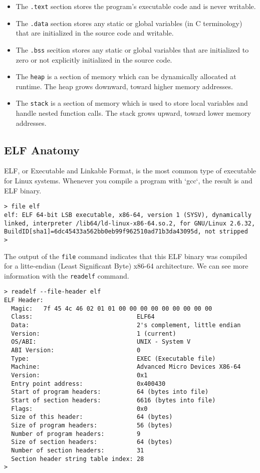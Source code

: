 \begin{itemize}
    \item The \texttt{.text} section stores the program's executable code and is
never writable.
    \item The \texttt{.data} section stores any static or global variables (in C
terminology) that are initialized in the source code and writable.
    \item The \texttt{.bss} secition stores any static or global variables that
are initialized to zero or not explicitly initialized in the source code.
    \item The \texttt{heap} is a section of memory which can be dynamically
allocated at runtime. The heap grows downward, toward higher memory addresses.
    \item The \texttt{stack} is a section of memory which is used to store
local variables and handle nested function calls. The stack grows upward, toward
lower memory addresses.
\end{itemize}

\subsection{ELF Anatomy}
ELF, or Executable and Linkable Format, is the most common type of executable
for Linux systems. Whenever you compile a program with `gcc`, the result is and
ELF binary.

\begin{lstlisting}
> file elf
elf: ELF 64-bit LSB executable, x86-64, version 1 (SYSV), dynamically linked, interpreter /lib64/ld-linux-x86-64.so.2, for GNU/Linux 2.6.32, BuildID[sha1]=6dc45433a562bb0eb99f962510ad71b3da43095d, not stripped
> 
\end{lstlisting}

The output of the \texttt{file} command indicates that this ELF binary was
compiled for a litte-endian (Least Significant Byte) x86-64 architecture. We can
see more information with the \texttt{readelf} command.

\begin{lstlisting}
> readelf --file-header elf
ELF Header:
  Magic:   7f 45 4c 46 02 01 01 00 00 00 00 00 00 00 00 00 
  Class:                             ELF64
  Data:                              2's complement, little endian
  Version:                           1 (current)
  OS/ABI:                            UNIX - System V
  ABI Version:                       0
  Type:                              EXEC (Executable file)
  Machine:                           Advanced Micro Devices X86-64
  Version:                           0x1
  Entry point address:               0x400430
  Start of program headers:          64 (bytes into file)
  Start of section headers:          6616 (bytes into file)
  Flags:                             0x0
  Size of this header:               64 (bytes)
  Size of program headers:           56 (bytes)
  Number of program headers:         9
  Size of section headers:           64 (bytes)
  Number of section headers:         31
  Section header string table index: 28
> 
\end{lstlisting}

